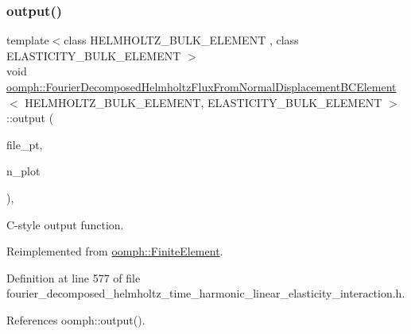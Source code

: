 \subsubsection{\texorpdfstring{output()}{output()}\hspace{0.1cm}{\footnotesize\ttfamily [4/4]}}
{\footnotesize\ttfamily template$<$class H\+E\+L\+M\+H\+O\+L\+T\+Z\+\_\+\+B\+U\+L\+K\+\_\+\+E\+L\+E\+M\+E\+NT , class E\+L\+A\+S\+T\+I\+C\+I\+T\+Y\+\_\+\+B\+U\+L\+K\+\_\+\+E\+L\+E\+M\+E\+NT $>$ \\
void \hyperlink{classoomph_1_1FourierDecomposedHelmholtzFluxFromNormalDisplacementBCElement}{oomph\+::\+Fourier\+Decomposed\+Helmholtz\+Flux\+From\+Normal\+Displacement\+B\+C\+Element}$<$ H\+E\+L\+M\+H\+O\+L\+T\+Z\+\_\+\+B\+U\+L\+K\+\_\+\+E\+L\+E\+M\+E\+NT, E\+L\+A\+S\+T\+I\+C\+I\+T\+Y\+\_\+\+B\+U\+L\+K\+\_\+\+E\+L\+E\+M\+E\+NT $>$\+::output (\begin{DoxyParamCaption}\item[{F\+I\+LE $\ast$}]{file\+\_\+pt,  }\item[{const unsigned \&}]{n\+\_\+plot }\end{DoxyParamCaption})\hspace{0.3cm}{\ttfamily [inline]}, {\ttfamily [virtual]}}



C-\/style output function. 



Reimplemented from \hyperlink{classoomph_1_1FiniteElement_adfaee690bb0608f03320eeb9d110d48c}{oomph\+::\+Finite\+Element}.



Definition at line 577 of file fourier\+\_\+decomposed\+\_\+helmholtz\+\_\+time\+\_\+harmonic\+\_\+linear\+\_\+elasticity\+\_\+interaction.\+h.



References oomph\+::output().

\mbox{\label{classoomph_1_1FourierDecomposedHelmholtzFluxFromNormalDisplacementBCElement_ae9aa741774cfc14e95ff9113844119f5}} 
